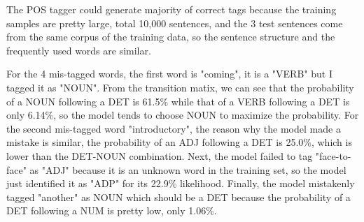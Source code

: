 \documentclass{article}
\begin{document}
The POS tagger could generate majority of correct tags because the training samples are pretty large, total 10,000 sentences, and the 3 test sentences come from the same corpus of the training data, so the sentence structure and the frequently used words are similar. 

For the 4 mis-tagged words, the first word is "coming", it is a "VERB" but I tagged it as "NOUN". From the transition matix, we can see that the probability of a NOUN following a DET is 61.5\% while that of a VERB following a DET is only 6.14\%, so the model tends to choose NOUN to maximize the probability. For the second mis-tagged word "introductory", the reason why the model made a mistake is similar, the probability of an ADJ following a DET is 25.0\%, which is lower than the DET-NOUN combination. Next, the model failed to tag "face-to-face" as "ADJ" because it is an unknown word in the training set, so the model just identified it as "ADP" for its 22.9\% likelihood. Finally, the model mistakenly tagged "another" as NOUN which should be a DET because the probability of a DET following a NUM is pretty low, only 1.06\%.
\end{document}
